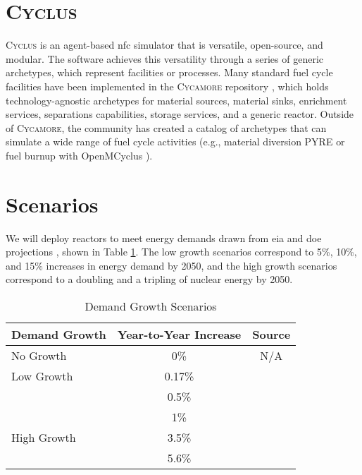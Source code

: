 \documentclass{anstrans}
\newcommand{\cycamore}{\textsc{Cycamore}\xspace}
\newcommand{\cyclus}{\textsc{Cyclus}\xspace}
\begin{document}
\section{\cyclus}

\cyclus \cite{huff_cyclus_intro_2016} is an agent-based \gls{nfc} simulator
that is versatile, open-source, and modular. The software achieves this
versatility through a series of generic archetypes, which represent facilities
or processes. Many standard fuel cycle facilities have
been implemented in the \cycamore repository \cite{Carlsen_cycamore_2014},
which holds technology-agnostic archetypes for material sources, material
sinks, enrichment services, separations capabilities, storage services, and a
generic reactor. Outside of \cycamore, the community has created a catalog of
archetypes that can simulate a wide range of fuel cycle activities (e.g.,
material diversion PYRE \cite{westphal_modeling_2019} or fuel burnup with
OpenMCyclus \cite{openmcyclus_paper}).


\section{Scenarios}
We will deploy reactors to meet energy demands drawn from \gls{eia} \cite{eia_aeo_2023} and \gls{doe} projections \cite{julie_liftoff_pathways_2024}, shown in Table \ref{tab:demand_scenarios}. The low growth scenarios correspond to 5\%, 10\%, and 15\% increases in energy demand by 2050, and the high growth scenarios correspond to a doubling and a tripling of nuclear energy by 2050.

\begin{table}[h]
  \centering
  \caption{Demand Growth Scenarios}
  \label{tab:demand_scenarios}
  \begin{tabular}{l c c}
      \hline
      \textbf{Demand Growth} & \textbf{Year-to-Year Increase} & \textbf{Source}\\
      \hline
      No Growth & 0\% & N/A\\
      Low Growth & 0.17\% & \cite{eia_aeo_2023}\\
       & 0.5\% & \cite{eia_aeo_2023}\\
       & 1\% & \cite{eia_aeo_2023}\\
      High Growth & 3.5\% & \cite{julie_liftoff_pathways_2024} \\
       & 5.6\% & \cite{julie_liftoff_pathways_2024}\\
      \hline
  \end{tabular}
\end{table}
\end{document}
